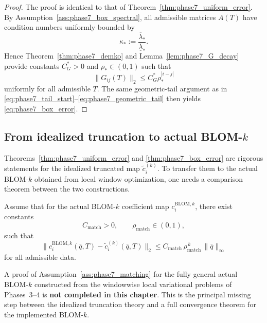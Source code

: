 \begin{proof}
	The proof is identical to that of Theorem~\ref{thm:phase7_uniform_error}.
	By Assumption~\ref{ass:phase7_box_spectral}, all admissible matrices \(A(T)\) have condition numbers uniformly bounded by
	\[
	\kappa_\ast:=\frac{\overline\lambda_\ast}{\underline\lambda_\ast}.
	\]
	Hence Theorem~\ref{thm:phase7_demko} and Lemma~\ref{lem:phase7_G_decay} provide constants \(C_G^\ast>0\) and \(\rho_\ast\in(0,1)\) such that
	\[
	\|G_{ij}(T)\|_2\le C_G^\ast \rho_\ast^{|i-j|}
	\]
	uniformly for all admissible \(T\).
	The same geometric-tail argument as in \eqref{eq:phase7_tail_start}--\eqref{eq:phase7_geometric_tail} then yields \eqref{eq:phase7_box_error}.
\end{proof}

\subsection{From idealized truncation to actual BLOM-\texorpdfstring{$k$}{k}}
\label{subsec:phase7_matching}

Theorems~\ref{thm:phase7_uniform_error} and \ref{thm:phase7_box_error} are rigorous statements for the idealized truncated map \(\tilde c_i^{(k)}\).
To transfer them to the actual BLOM-\(k\) obtained from local window optimization, one needs a comparison theorem between the two constructions.

\begin{assumption}
	\label{ass:phase7_matching}
	Assume that for the actual BLOM-\(k\) coefficient map \(c_i^{\mathrm{BLOM},k}\), there exist constants
	\[
	C_{\mathrm{match}}>0,\qquad \rho_{\mathrm{match}}\in(0,1),
	\]
	such that
	\begin{equation}
		\label{eq:phase7_matching}
		\bigl\|
		c_i^{\mathrm{BLOM},k}(\bar q,T)-\tilde c_i^{(k)}(\bar q,T)
		\bigr\|_2
		\le
		C_{\mathrm{match}}\,\rho_{\mathrm{match}}^{\,k}\,\|\bar q\|_\infty
	\end{equation}
	for all admissible data.
\end{assumption}

\begin{remark}
	\label{rem:phase7_matching_limitation}
	A proof of Assumption~\ref{ass:phase7_matching} for the fully general actual BLOM-\(k\) constructed from the windowwise local variational problems of Phases~3--4 is \textbf{not completed in this chapter}.
	This is the principal missing step between the idealized truncation theory and a full convergence theorem for the implemented BLOM-\(k\).
\end{remark}

